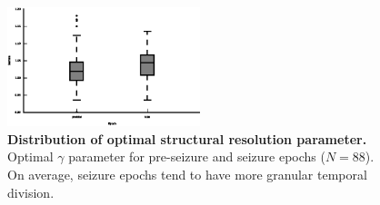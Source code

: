 \begin{figure}[H]
    \centering
    \includegraphics[width=0.5\textwidth]{optgamma.eps}
    \caption[Distribution of optimal structural resolution parameter]{\textbf{Distribution of optimal structural resolution parameter.} Optimal $\gamma$ parameter for pre-seizure and seizure epochs ($N=88$). On average, seizure epochs tend to have more granular temporal division.\label{ch3:figS2}}
\end{figure}

